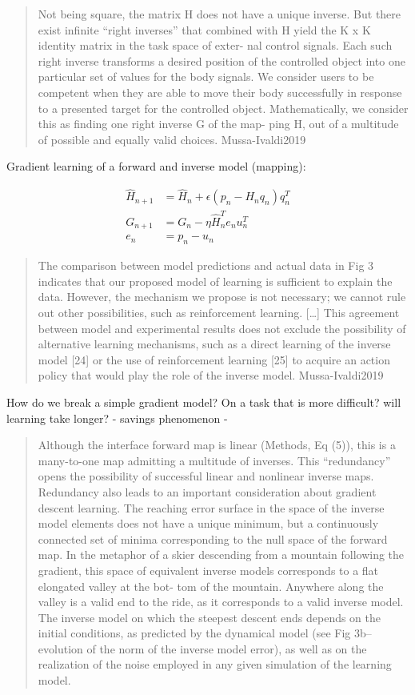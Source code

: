 \documentclass[
  a4paper,
]{article}
\begin{document}
\begin{quote}
Not being square, the matrix H does not have a unique inverse. But there
exist infinite ``right inverses'' that combined with H yield the K x K
identity matrix in the task space of exter- nal control signals. Each
such right inverse transforms a desired position of the controlled
object into one particular set of values for the body signals. We
consider users to be competent when they are able to move their body
successfully in response to a presented target for the controlled
object. Mathematically, we consider this as finding one right inverse G
of the map- ping H, out of a multitude of possible and equally valid
choices. Mussa-Ivaldi2019
\end{quote}

Gradient learning of a forward and inverse model (mapping):

\begin{align*}
    \hat{H}_{n+1} &= \hat{H}_n + \epsilon(p_n - H_nq_n)q_n^T  \\
    G_{n+1} &= G_n - \eta\hat{H}_n^Te_nu_n^T \\
    e_n &= p_n - u_n
\end{align*}

\begin{quote}
The comparison between model predictions and actual data in Fig 3
indicates that our proposed model of learning is sufficient to explain
the data. However, the mechanism we propose is not necessary; we cannot
rule out other possibilities, such as reinforcement learning.
{[}\ldots{]} This agreement between model and experimental results does
not exclude the possibility of alternative learning mechanisms, such as
a direct learning of the inverse model {[}24{]} or the use of
reinforcement learning {[}25{]} to acquire an action policy that would
play the role of the inverse model. Mussa-Ivaldi2019
\end{quote}

How do we break a simple gradient model? On a task that is more
difficult? will learning take longer? - savings phenomenon -

\begin{quote}
Although the interface forward map is linear (Methods, Eq (5)), this is
a many-to-one map admitting a multitude of inverses. This ``redundancy''
opens the possibility of successful linear and nonlinear inverse maps.
Redundancy also leads to an important consideration about gradient
descent learning. The reaching error surface in the space of the inverse
model elements does not have a unique minimum, but a continuously
connected set of minima corresponding to the null space of the forward
map. In the metaphor of a skier descending from a mountain following the
gradient, this space of equivalent inverse models corresponds to a flat
elongated valley at the bot- tom of the mountain. Anywhere along the
valley is a valid end to the ride, as it corresponds to a valid inverse
model. The inverse model on which the steepest descent ends depends on
the initial conditions, as predicted by the dynamical model (see Fig
3b--evolution of the norm of the inverse model error), as well as on the
realization of the noise employed in any given simulation of the
learning model.
\end{quote}
\end{document}
